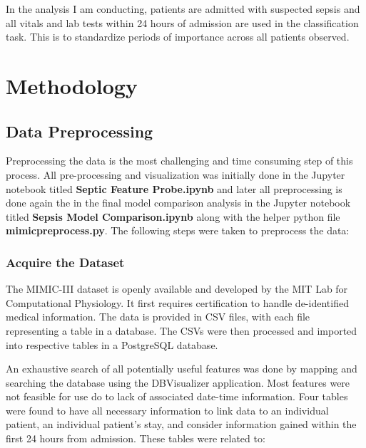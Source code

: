 \documentclass[11pt]{article}
\begin{document}
	In the analysis I am conducting, patients are admitted with suspected sepsis and all vitals and lab tests within 24 hours of admission are used in the classification task. This is to standardize periods of importance across all patients observed.
	
	\section{Methodology}
	\subsection{Data Preprocessing}
	Preprocessing the data is the most challenging and time consuming step of this process. All pre-processing and visualization was initially done in the Jupyter notebook titled \textbf{Septic Feature Probe.ipynb} and later all preprocessing is done again the in the final model comparison analysis in the Jupyter notebook titled \textbf{Sepsis Model Comparison.ipynb} along with the helper python file \textbf{mimicpreprocess.py}. The following steps were taken to preprocess the data:
	
		\subsubsection{Acquire the Dataset}
		The MIMIC-III dataset is openly available and developed by the MIT Lab for Computational Physiology. It first requires certification to handle de-identified medical information. The data is provided in CSV files, with each file representing a table in a database. The CSVs were then processed and imported into respective tables in a PostgreSQL database.
		
		An exhaustive search of all potentially useful features was done by mapping and searching the database using the DBVisualizer application. Most features were not feasible for use do to lack of associated date-time information. Four tables were found to have all necessary information to link data to an individual patient, an individual patient's stay, and consider information gained within the first 24 hours from admission. These tables were related to:
		
\end{document}
